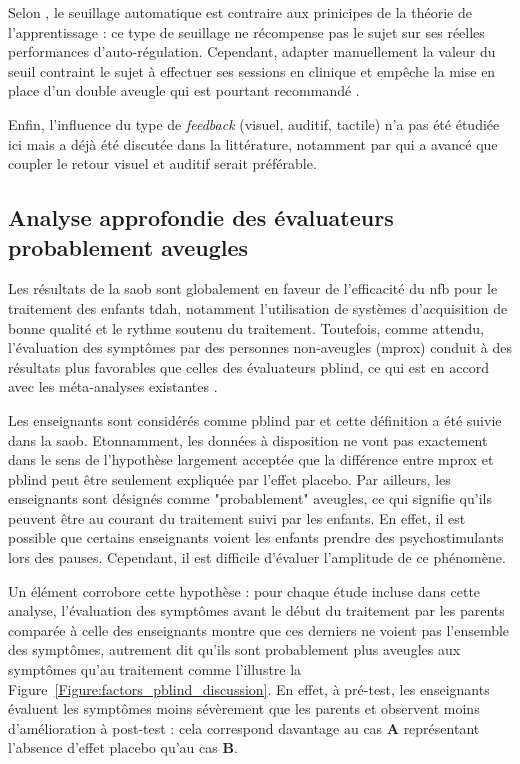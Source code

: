 Selon \citet{Arns2014}, le seuillage automatique est contraire aux prinicipes de la théorie de l'apprentissage : ce type de seuillage ne récompense
pas le sujet sur ses réelles performances d'auto-régulation. Cependant, adapter manuellement la valeur du seuil contraint le sujet à effectuer ses sessions en 
clinique et empêche la mise en place d'un double aveugle \citep{Lansbergen2011} qui est pourtant recommandé \citep{Ros2019}. 

Enfin, l'influence du type de \textit{feedback} (visuel, auditif, tactile) n'a pas été étudiée ici mais a déjà été discutée dans la littérature, 
notamment par \citet{Vernon2004} qui a avancé que coupler le retour visuel et auditif serait préférable. 

\subsection{Analyse approfondie des évaluateurs probablement aveugles} \label{pblind_anaysis}

Les résultats de la \gls{saob} sont globalement en faveur de l'efficacité du \gls{nfb} pour le traitement des enfants \gls{tdah}, notamment l'utilisation 
de systèmes d'acquisition de bonne qualité et le rythme soutenu du traitement. Toutefois, comme attendu, l'évaluation
des symptômes par des personnes non-aveugles (\gls{mprox}) conduit à des résultats plus favorables que celles des évaluateurs \gls{pblind}, ce qui est en accord avec les
méta-analyses existantes \citep{Micoulaud2014, Cortese2016}. 

Les enseignants sont considérés comme \gls{pblind} par \citet{Cortese2016, Micoulaud2014} et cette définition a été suivie dans la \gls{saob}. Etonnamment, les données
à disposition ne vont pas exactement dans le sens de l'hypothèse largement acceptée que la différence entre \gls{mprox} et \gls{pblind} peut être seulement 
expliquée par l'effet placebo. Par ailleurs, les enseignants sont désignés comme "probablement" aveugles, ce qui signifie qu'ils peuvent être au courant du
traitement suivi par les enfants. En effet, il est possible que certains enseignants voient les enfants prendre des psychostimulants lors des pauses.
Cependant, il est difficile d'évaluer l'amplitude de ce phénomène. 

Un élément corrobore cette hypothèse : pour chaque étude incluse dans cette analyse, l'évaluation des symptômes avant le début
du traitement par les parents comparée à celle des enseignants montre que ces derniers ne voient pas l'ensemble des symptômes, autrement dit qu'ils sont probablement
plus aveugles aux symptômes qu'au traitement comme l'illustre la Figure~\ref{Figure:factors_pblind_discussion}. En effet, à pré-test, les enseignants évaluent les 
symptômes moins sévèrement que les parents et observent moins d'amélioration à post-test : cela correspond davantage au cas \textbf{A} représentant l'absence d'effet placebo
qu'au cas \textbf{B}.

